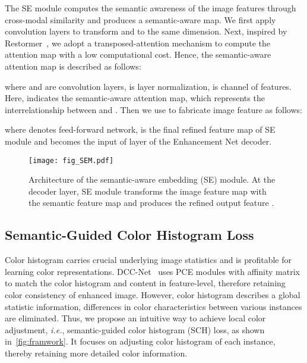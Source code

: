 \documentclass[10pt,twocolumn,letterpaper]{article}
\begin{document}
The SE module computes the semantic awareness of the image features through cross-modal similarity and produces a semantic-aware map. We first apply convolution layers to transform  and  to the same dimension. Next, inspired by Restormer~\cite{zamir2022restormer}, we adopt a transposed-attention mechanism to compute the attention map with a low computational cost. Hence, the semantic-aware attention map is described as follows:
\vspace{-0.1cm}


where  and  are convolution layers,  is layer normalization,  is channel of features. Here,  indicates the semantic-aware attention map, which represents the interrelationship between  and . Then we use  to fabricate image feature  as follows:
\vspace{-0.1cm}

where  denotes feed-forward network,  is the final refined feature map of  SE module and becomes the input of  layer of the Enhancement Net decoder.

\begin{figure}[t]
  \centering
   \texttt{[image: fig\_SEM.pdf]}
   \setlength{\abovecaptionskip}{-0.3cm}
   \setlength{\belowcaptionskip}{-0.5cm}
   \caption{Architecture of the semantic-aware embedding (SE) module. At the  decoder layer, SE module transforms the image feature map  with the semantic feature map  and produces the refined output feature .}
   \label{fig:msam}
\end{figure}

\subsection{Semantic-Guided Color Histogram Loss}
\label{subsec:scloss}

Color histogram carries crucial underlying image statistics and is profitable for learning color representations. DCC-Net~\cite{zhang2022colordccnet} uses PCE modules with affinity matrix to match the color histogram and content in feature-level, therefore retaining color consistency of enhanced image. However, color histogram describes a global statistic information, differences in color characteristics between various instances are eliminated. Thus, we propose an intuitive way to achieve local color adjustment, \textit{i.e.}, semantic-guided color histogram (SCH) loss, as shown in~\cref{fig:framwork}. It focuses on adjusting color histogram of each instance, thereby retaining more detailed color information. 
\end{document}
